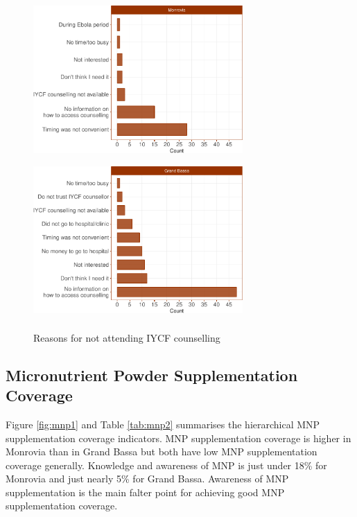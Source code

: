 \documentclass[12pt,a4paper]{article}
\theoremstyle{definition}
\theoremstyle{definition}
\theoremstyle{definition}
\theoremstyle{remark}
\begin{document}
\begin{figure}[H]

{\centering \includegraphics[width=8cm,height=6cm]{liberiaCoverageReport_files/figure-latex/icf3a-1} \includegraphics[width=8cm,height=6cm]{liberiaCoverageReport_files/figure-latex/icf3a-2} 

}

\caption{Reasons for not attending IYCF counselling}\label{fig:icf3a}
\end{figure}

\newpage

\hypertarget{micronutrient-powder-supplementation-coverage}{%
\subsection{Micronutrient Powder Supplementation
Coverage}\label{micronutrient-powder-supplementation-coverage}}

Figure \ref{fig:mnp1} and Table \ref{tab:mnp2} summarises the
hierarchical MNP supplementation coverage indicators. MNP
supplementation coverage is higher in Monrovia than in Grand Bassa but
both have low MNP supplementation coverage generally. Knowledge and
awareness of MNP is just under 18\% for Monrovia and just nearly 5\% for
Grand Bassa. Awareness of MNP supplementation is the main falter point
for achieving good MNP supplementation coverage.
\end{document}

